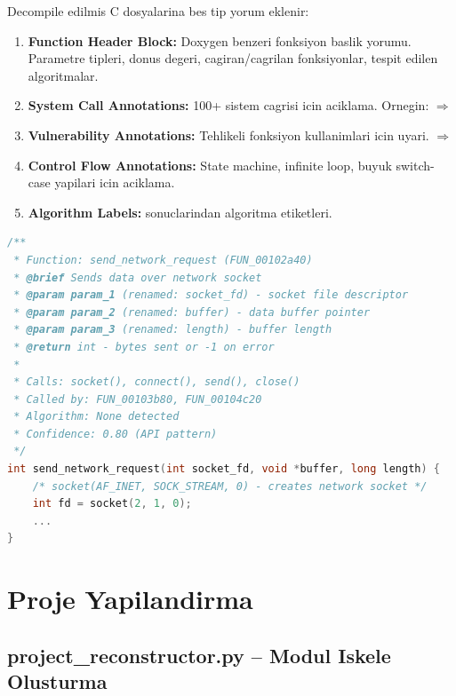 Decompile edilmis C dosyalarina bes tip yorum eklenir:

\begin{enumerate}
  \item \textbf{Function Header Block:} Doxygen benzeri fonksiyon baslik yorumu.
        Parametre tipleri, donus degeri, cagiran/cagrilan fonksiyonlar, tespit
        edilen algoritmalar.
  \item \textbf{System Call Annotations:} 100+ sistem cagrisi icin aciklama.
        Ornegin:  $\Rightarrow$ 
  \item \textbf{Vulnerability Annotations:} Tehlikeli fonksiyon kullanimlari icin
        uyari.  $\Rightarrow$ 
  \item \textbf{Control Flow Annotations:} State machine, infinite loop,
        buyuk switch-case yapilari icin aciklama.
  \item \textbf{Algorithm Labels:}  sonuclarindan
        algoritma etiketleri.
\end{enumerate}

\begin{lstlisting}[language=C, caption={Otomatik yorum uretimi ornegi}]
/**
 * Function: send_network_request (FUN_00102a40)
 * @brief Sends data over network socket
 * @param param_1 (renamed: socket_fd) - socket file descriptor
 * @param param_2 (renamed: buffer) - data buffer pointer
 * @param param_3 (renamed: length) - buffer length
 * @return int - bytes sent or -1 on error
 *
 * Calls: socket(), connect(), send(), close()
 * Called by: FUN_00103b80, FUN_00104c20
 * Algorithm: None detected
 * Confidence: 0.80 (API pattern)
 */
int send_network_request(int socket_fd, void *buffer, long length) {
    /* socket(AF_INET, SOCK_STREAM, 0) - creates network socket */
    int fd = socket(2, 1, 0);
    ...
}
\end{lstlisting}


\section{Proje Yapilandirma}
\label{sec:project-structure}

\subsection{project\_reconstructor.py -- Modul Iskele Olusturma}

